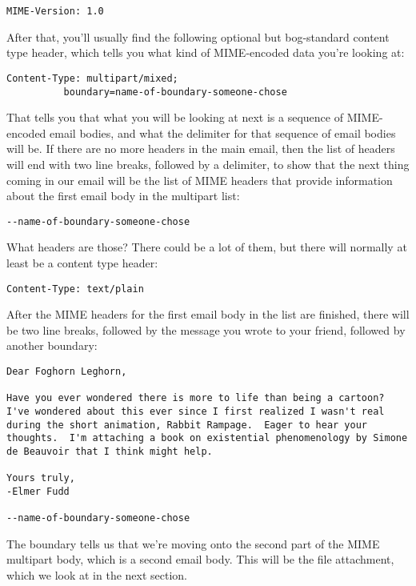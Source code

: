 \documentclass[11pt]{article}
\begin{document}
\begin{verbatim}
MIME-Version: 1.0
\end{verbatim}

After that, you'll usually find the following optional but
bog-standard content type header, which tells you what kind of
MIME-encoded data you're looking at:

\begin{verbatim}
Content-Type: multipart/mixed; 
          boundary=name-of-boundary-someone-chose
\end{verbatim}

That tells you that what you will be looking at next is a sequence of
MIME-encoded email bodies, and what the delimiter for that sequence of
email bodies will be.  If there are no more headers in the main email,
then the list of headers will end with two line breaks, followed by a
delimiter, to show that the next thing coming in our email will be the
list of MIME headers that provide information about the first email
body in the multipart list:

\begin{verbatim}
--name-of-boundary-someone-chose
\end{verbatim}

What headers are those?  There could be a lot of them, but there will
normally at least be a content type header:

\begin{verbatim}
Content-Type: text/plain
\end{verbatim}

After the MIME headers for the first email body in the list are
finished, there will be two line breaks, followed by the message you
wrote to your friend, followed by another boundary:

\begin{verbatim}
Dear Foghorn Leghorn,

Have you ever wondered there is more to life than being a cartoon?
I've wondered about this ever since I first realized I wasn't real
during the short animation, Rabbit Rampage.  Eager to hear your
thoughts.  I'm attaching a book on existential phenomenology by Simone
de Beauvoir that I think might help.

Yours truly,
-Elmer Fudd

--name-of-boundary-someone-chose
\end{verbatim}

The boundary tells us that we're moving onto the second part of the
MIME multipart body, which is a second email body.  This will be the
file attachment, which we look at in the next section.
\end{document}

